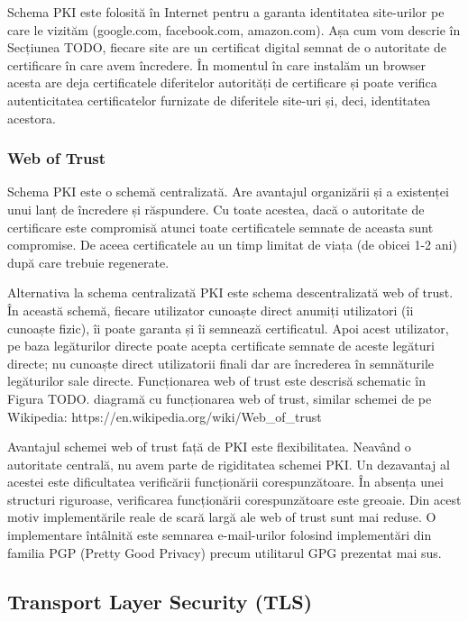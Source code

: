 Schema PKI este folosită în Internet pentru a garanta identitatea site-urilor pe care le vizităm (google.com, facebook.com, amazon.com). Așa cum vom descrie în Secțiunea TODO, fiecare site are un certificat digital semnat de o autoritate de certificare în care avem încredere. În momentul în care instalăm un browser acesta are deja certificatele diferitelor autorități de certificare și poate verifica autenticitatea certificatelor furnizate de diferitele site-uri și, deci, identitatea acestora.

\subsubsection{Web of Trust}
\label{sec:sec:wot}

Schema PKI este o schemă centralizată. Are avantajul organizării și a existenței unui lanț de încredere și răspundere. Cu toate acestea, dacă o autoritate de certificare este compromisă atunci toate certificatele semnate de aceasta sunt compromise. De aceea certificatele au un timp limitat de viața (de obicei 1-2 ani) după care trebuie regenerate.

Alternativa la schema centralizată PKI este schema descentralizată web of trust. În această schemă, fiecare utilizator cunoaște direct anumiți utilizatori (îi cunoaște fizic), îi poate garanta și îi semnează certificatul. Apoi acest utilizator, pe baza legăturilor directe poate acepta certificate semnate de aceste legături directe; nu cunoaște direct utilizatorii finali dar are încrederea în semnăturile legăturilor sale directe. Funcționarea web of trust este descrisă schematic în Figura TODO.
diagramă cu funcționarea web of trust, similar schemei de pe Wikipedia: https://en.wikipedia.org/wiki/Web_of_trust

Avantajul schemei web of trust față de PKI este flexibilitatea. Neavând o autoritate centrală, nu avem parte de rigiditatea schemei PKI. Un dezavantaj al acestei este dificultatea verificării funcționării corespunzătoare. În absența unei structuri riguroase, verificarea funcționării corespunzătoare este greoaie. Din acest motiv implementările reale de scară largă ale web of trust sunt mai reduse. O implementare întâlnită este semnarea e-mail-urilor folosind implementări din familia PGP (Pretty Good Privacy) precum utilitarul GPG prezentat mai sus.

\subsection{Transport Layer Security (TLS)}
\label{sec:sec:tls}

